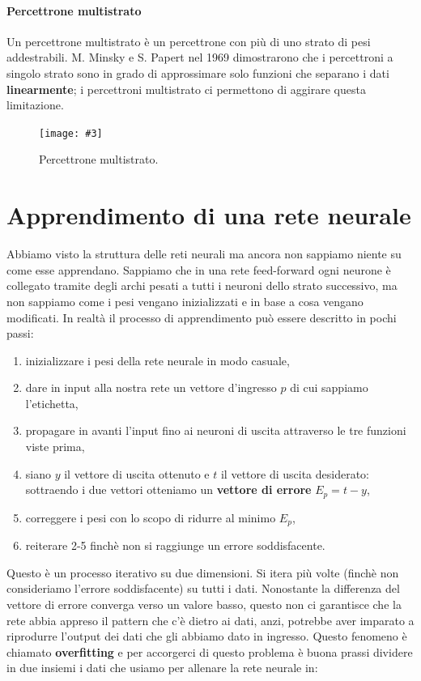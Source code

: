 \documentclass[12pt, twoside, letterpaper]{report}
\newcommand{\img}[4] {
	\begin{figure}
		\centering
		\texttt{[image: \#3]}\\
		\caption{#1}
		\label{#4}
	\end{figure}
}
\begin{document}
			\paragraph{Percettrone multistrato} Un percettrone multistrato è un percettrone con più di uno strato di pesi addestrabili. M. Minsky e S. Papert nel 1969 \cite{minsky_papert} dimostrarono che i percettroni a singolo strato sono in grado di approssimare solo funzioni che separano i dati \textbf{linearmente}; i percettroni multistrato ci permettono di aggirare questa limitazione. 
				\img{Percettrone multistrato. \cite{kriesel}}{0.5}{nn-feed-forward.png}{feedforward}
		
		\section{Apprendimento di una rete neurale}
			Abbiamo visto la struttura delle reti neurali ma ancora non sappiamo niente su come esse apprendano. Sappiamo che in una rete feed-forward ogni neurone è collegato tramite degli archi pesati a tutti i neuroni dello strato successivo, ma non sappiamo come i pesi vengano inizializzati e in base a cosa vengano modificati. In realtà il processo di apprendimento può essere descritto in pochi passi: 
			\begin{enumerate}
				\item inizializzare i pesi della rete neurale in modo casuale,
				\item dare in input alla nostra rete un vettore d'ingresso $p$ di cui sappiamo l'etichetta,
				\item propagare in avanti l'input fino ai neuroni di uscita attraverso le tre funzioni viste prima, 
				\item siano $y$ il vettore di uscita ottenuto e $t$ il vettore di uscita desiderato: sottraendo i due vettori otteniamo un \textbf{vettore di errore} $E_p = t - y$,
				\item correggere i pesi con lo scopo di ridurre al minimo $E_p$,
				\item reiterare 2-5 finchè non si raggiunge un errore soddisfacente.
			\end{enumerate}
			Questo è un processo iterativo su due dimensioni. Si itera più volte (finchè non consideriamo l'errore soddisfacente) su tutti i dati. Nonostante la differenza del vettore di errore converga verso un valore basso, questo non ci garantisce che la rete abbia appreso il pattern che c'è dietro ai dati, anzi, potrebbe aver imparato a riprodurre l'output dei dati che gli abbiamo dato in ingresso. Questo fenomeno è chiamato \textbf{overfitting} e per accorgerci di questo problema è buona prassi dividere in due insiemi i dati che usiamo per allenare la rete neurale in: 
\end{document}

